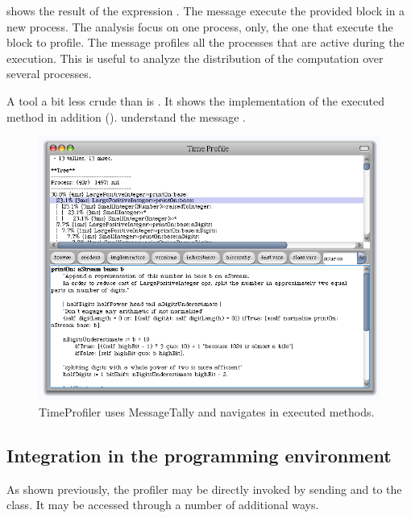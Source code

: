 \documentclass[a4paper,10pt,twoside]{book}
\begin{document}
 shows the result of the expression .
The message  execute the provided block in a new process. The analysis focus on one process, only, the one that execute the block to profile. The message  profiles all the processes that are active during the execution. This is useful to analyze the distribution of the computation over several processes.


A tool a bit less crude than  is . It shows the implementation of the executed method in addition ().   understand the message .


\begin{figure}
	\begin{center}
	\includegraphics[width=.8\linewidth]{TimeProfiler}
	\caption{TimeProfiler uses MessageTally and navigates in executed methods.
}
	\end{center}
\end{figure}


\subsection{Integration in the programming environment}
As shown previously, the profiler may be directly invoked by sending  and  to the  class. It may be accessed through a number of additional ways.
\end{document}
